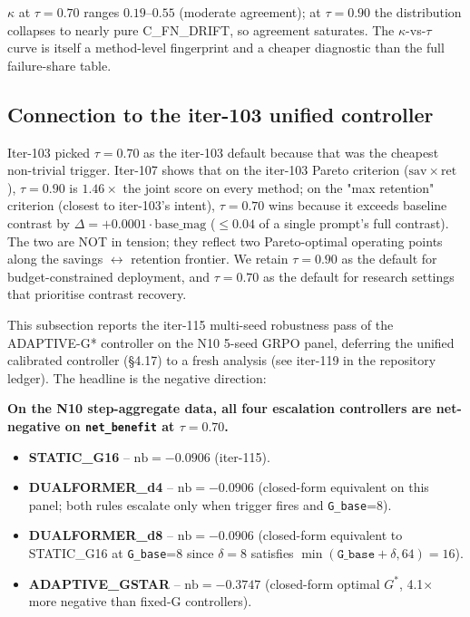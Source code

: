 \documentclass{article}
\begin{document}
$\kappa$ at $\tau{=}0.70$ ranges $0.19$--$0.55$ (moderate agreement);
at $\tau{=}0.90$ the distribution collapses to nearly pure C\_FN\_DRIFT,
so agreement saturates.  The $\kappa$-vs-$\tau$ curve is itself a
method-level fingerprint and a cheaper diagnostic than the full
failure-share table.

\subsection{Connection to the iter-103 unified controller}

Iter-103 picked $\tau{=}0.70$ as the iter-103 default because that was
the cheapest non-trivial trigger.  Iter-107 shows that on the iter-103
Pareto criterion ($\mathrm{sav} \times \mathrm{ret}$), $\tau{=}0.90$ is
$1.46\times$ the joint score on every method; on the "max retention"
criterion (closest to iter-103's intent), $\tau{=}0.70$ wins because it
exceeds baseline contrast by $\Delta = +0.0001 \cdot \mathrm{base\_mag}$
($\le 0.04$ of a single prompt's full contrast).  The two are NOT in
tension; they reflect two Pareto-optimal operating points along the
savings $\leftrightarrow$ retention frontier.  We retain $\tau{=}0.90$ as
the default for budget-constrained deployment, and $\tau{=}0.70$ as the
default for research settings that prioritise contrast recovery.
 \label{sec:p7-adaptive-gstar-n10-multiseed}

This subsection reports the iter-115 multi-seed robustness pass of the
ADAPTIVE-G* controller on the N10 5-seed GRPO panel, deferring the
unified calibrated controller (§4.17) to a fresh analysis
(see iter-119 in the repository ledger). The headline is the negative direction:

\textbf{On the N10 step-aggregate data, all four escalation controllers
  are net-negative on \texttt{net\_benefit} at $\tau=0.70$.}

\begin{itemize}
\item \textbf{STATIC\_G16} -- $\mathrm{nb}=-0.0906$ (iter-115).
\item \textbf{DUALFORMER\_d4} -- $\mathrm{nb}=-0.0906$ (closed-form
  equivalent on this panel; both rules escalate only when trigger fires
  and \texttt{G\_base}=8).
\item \textbf{DUALFORMER\_d8} -- $\mathrm{nb}=-0.0906$ (closed-form
  equivalent to STATIC\_G16 at \texttt{G\_base}=8 since $\delta=8$
  satisfies $\min(\texttt{G\_base}+\delta, 64)=16$).
\item \textbf{ADAPTIVE\_GSTAR} -- $\mathrm{nb}=-0.3747$ (closed-form
  optimal $G^*$, 4.1$\times$ more negative than fixed-G controllers).
\end{itemize}
\end{document}

